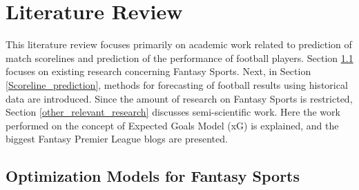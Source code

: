 
\chapter{Literature Review}
This literature review focuses primarily on academic work related to prediction of match scorelines and prediction of the performance of football players. Section \ref{Opt_Models_for_Fantasy_Sports} focuses on existing research concerning Fantasy Sports. Next, in Section \ref{Scoreline_prediction}, methods for forecasting of football results using historical data are introduced. Since the amount of research on Fantasy Sports is restricted, Section \ref{other_relevant_research} discusses semi-scientific work.  Here the work performed on the concept of Expected Goals Model (xG) is explained, and the biggest Fantasy Premier League blogs are presented. 



\section{Optimization Models for Fantasy Sports} \label{Opt_Models_for_Fantasy_Sports}

